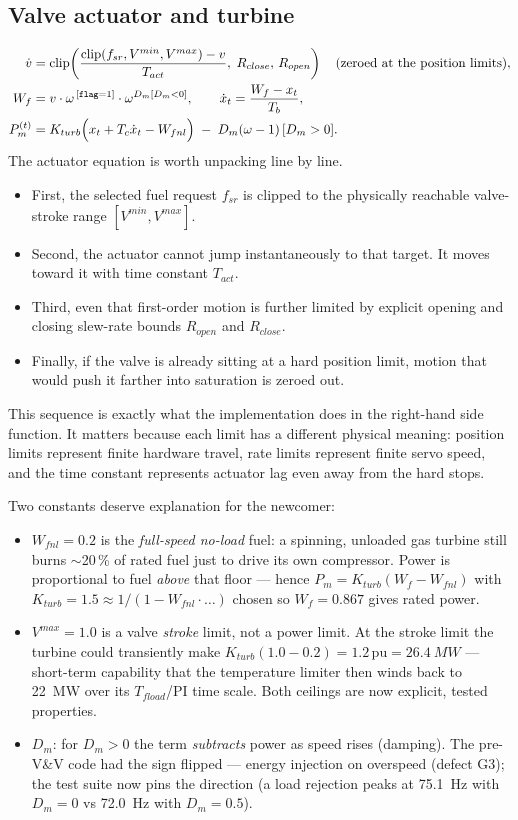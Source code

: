 \documentclass[11pt]{article}
\newcommand{\pu}{\,\text{pu}}
\begin{document}
\subsection{Valve actuator and turbine}
\begin{align}
  \dot v &= \text{clip}\!\left(\frac{\text{clip}(f_{sr},V^{min},V^{max}) - v}{T_{act}},\;
      R_{close},\, R_{open}\right)
      \quad\text{(zeroed at the position limits)},\\
  W_f &= v\cdot\omega^{\,[\texttt{flag}=1]} \cdot \omega^{D_m[D_m<0]}, \qquad
  \dot x_t = \frac{W_f - x_t}{T_b},\\
  P_m^{(t)} &= K_{turb}\Bigl(x_t + T_c\dot x_t - W_{fnl}\Bigr)
    \;-\; D_m(\omega-1)\,[D_m>0].
  \label{eq:turbine}
\end{align}
The actuator equation is worth unpacking line by line.
\begin{itemize}[nosep]
\item First, the selected fuel request $f_{sr}$ is clipped to the
  physically reachable valve-stroke range $[V^{min},V^{max}]$.
\item Second, the actuator cannot jump instantaneously to that target. It
  moves toward it with time constant $T_{act}$.
\item Third, even that first-order motion is further limited by explicit
  opening and closing slew-rate bounds $R_{open}$ and $R_{close}$.
\item Finally, if the valve is already sitting at a hard position limit,
  motion that would push it farther into saturation is zeroed out.
\end{itemize}
This sequence is exactly what the implementation does in the right-hand
side function. It matters because each limit has a different physical
meaning: position limits represent finite hardware travel, rate limits
represent finite servo speed, and the time constant represents actuator
lag even away from the hard stops.

Two constants deserve explanation for the newcomer:
\begin{itemize}[nosep]
\item $W_{fnl} = 0.2$ is the \emph{full-speed no-load} fuel: a spinning,
  unloaded gas turbine still burns $\sim$20\,\% of rated fuel just to
  drive its own compressor. Power is proportional to fuel \emph{above}
  that floor --- hence $P_m = K_{turb}(W_f - W_{fnl})$ with $K_{turb} =
  1.5 \approx 1/(1 - W_{fnl}\cdot\ldots)$ chosen so $W_f = 0.867$ gives
  rated power.
\item $V^{max} = 1.0$ is a valve \emph{stroke} limit, not a power limit.
  At the stroke limit the turbine could transiently make
  $K_{turb}(1.0-0.2) = 1.2\pu = \SI{26.4}{MW}$ --- short-term capability
  that the temperature limiter then winds back to \SI{22}{MW} over its
  $T_{fload}$/PI time scale. Both ceilings are now explicit, tested
  properties.
\item $D_m$: for $D_m > 0$ the term \emph{subtracts} power as speed rises
  (damping). The pre-V\&V code had the sign flipped --- energy injection
  on overspeed (defect G3); the test suite now pins the direction
  (a load rejection peaks at \SI{75.1}{Hz} with $D_m{=}0$ vs
  \SI{72.0}{Hz} with $D_m{=}0.5$).
\end{itemize}
\end{document}
